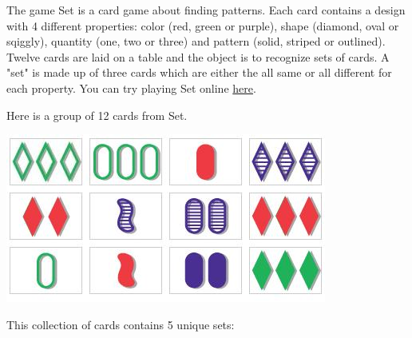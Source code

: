 \begin{problem}
The game Set is a card game about finding patterns. Each card contains a design with 4 different properties: color (red, green or purple), shape (diamond, oval or sqiggly), quantity (one, two or three) and pattern (solid, striped or outlined). Twelve cards are laid on a table and the object is to recognize sets of cards. A "set" is made up of three cards which are either the all same or all different for each property. You can try playing Set online \href{http://smart-games.org/en/set/start}{here}.

Here is a group of 12 cards from Set.

\vspace{5mm} 

\includegraphics{figures/set_game.jpg}

\vspace{5mm} 

This collection of cards contains 5 unique sets:
\vspace{5mm}


\end{problem}
